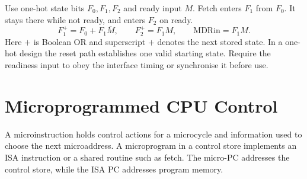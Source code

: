 \documentclass[12pt,a4paper]{article}
\begin{document}
\begin{tcolorbox}[examplebox,title={Derive a state equation with a memory wait}]
Use one-hot state bits $F_0,F_1,F_2$ and ready input $M$. Fetch enters $F_1$ from $F_0$. It stays there while not ready, and enters $F_2$ on ready.
\[
 F_1^{+}=F_0+F_1\overline M,\qquad
 F_2^{+}=F_1M,\qquad
 \mathrm{MDRin}=F_1M .
\]
Here $+$ is Boolean OR and superscript $+$ denotes the next stored state. In a one-hot design the reset path establishes one valid starting state. Require the readiness input to obey the interface timing or synchronise it before use.
\end{tcolorbox}

\section{Microprogrammed CPU Control}
\begin{tcolorbox}[defbox,title={Microinstruction and control store}]
A microinstruction holds control actions for a microcycle and information used to choose the next microaddress. A microprogram in a control store implements an ISA instruction or a shared routine such as fetch. The micro-PC addresses the control store, while the ISA PC addresses program memory.
\end{tcolorbox}

\begin{tcolorbox}[tikzbox,title={Microprogrammed controller},unbreakable]
\centering
{}
\end{tcolorbox}
\end{document}

